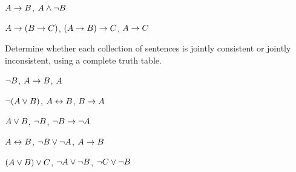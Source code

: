 \begin{practiceproblems}
\begin{problemslist}
		
		\item $A \rightarrow B$, $A \mathbin{\wedge} \neg B$\vspace{.5ex} %
		
		\item $A \rightarrow (B \rightarrow C)$, $(A \rightarrow B) \rightarrow C$, $A \rightarrow C$\vspace{.5ex} %
		
	\end{problemslist}
	
	\noindent\problempart
	\label{pr:TT:consistent3}
	Determine whether each collection of sentences is jointly consistent or jointly inconsistent, using a complete truth table.
	\begin{problemslist}
		\item $\neg B$, $A \rightarrow B$, $A$ \vspace{.5ex}%
		\item $\neg(A \vee B)$, $A \leftrightarrow B$, $B \rightarrow A$\vspace{.5ex} %
		\item $A \vee B$, $\neg B$, $\neg B \rightarrow \neg A$\vspace{.5ex} %
		\item $A \leftrightarrow B$, $\neg B \vee \neg A$, $A \rightarrow B$\vspace{.5ex} %
		\item $(A \vee B) \vee C$, $\neg A \vee \neg B$, $\neg C \vee \neg B$\vspace{.5ex} %
	\end{problemslist}
	
	
	

\end{practiceproblems}
